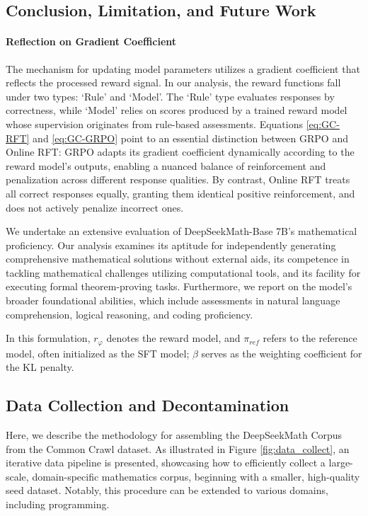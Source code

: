 \begin{itemize}[topsep=0pt]
\section{Conclusion, Limitation, and Future Work} 

\paragraph{Reflection on Gradient Coefficient} The mechanism for updating model parameters utilizes a gradient coefficient that reflects the processed reward signal. In our analysis, the reward functions fall under two types: `Rule' and `Model'. The `Rule' type evaluates responses by correctness, while `Model' relies on scores produced by a trained reward model whose supervision originates from rule-based assessments. Equations \ref{eq:GC-RFT} and \ref{eq:GC-GRPO} point to an essential distinction between GRPO and Online RFT: GRPO adapts its gradient coefficient dynamically according to the reward model's outputs, enabling a nuanced balance of reinforcement and penalization across different response qualities. By contrast, Online RFT treats all correct responses equally, granting them identical positive reinforcement, and does not actively penalize incorrect ones.

We undertake an extensive evaluation of DeepSeekMath-Base 7B’s mathematical proficiency. Our analysis examines its aptitude for independently generating comprehensive mathematical solutions without external aids, its competence in tackling mathematical challenges utilizing computational tools, and its facility for executing formal theorem-proving tasks. Furthermore, we report on the model's broader foundational abilities, which include assessments in natural language comprehension, logical reasoning, and coding proficiency.

In this formulation, $r_\varphi$ denotes the reward model, and $\pi_{ref}$ refers to the reference model, often initialized as the SFT model; $\beta$ serves as the weighting coefficient for the KL penalty.

\subsection{Data Collection and Decontamination} Here, we describe the methodology for assembling the DeepSeekMath Corpus from the Common Crawl dataset. As illustrated in Figure \ref{fig:data_collect}, an iterative data pipeline is presented, showcasing how to efficiently collect a large-scale, domain-specific mathematics corpus, beginning with a smaller, high-quality seed dataset. Notably, this procedure can be extended to various domains, including programming.


\end{itemize}
